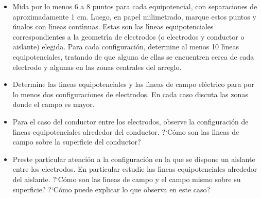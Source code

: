 \documentclass[laboratorio]{guia}
\begin{document}
\begin{itemize}
    \item Mida por lo menos 6 a 8 puntos para cada equipotencial, con
        separaciones de aproximadamente 1 cm. Luego, en papel milimetrado,
        marque estos puntos y \'unalos con l\'\i neas cont\'\i nuas. Estas son
        las l\'\i neas equipotenciales correspondientes a la geometr\'\i a de
        electrodos (o electrodos y conductor o aislante) elegida. Para cada
        configuraci\'on, determine al menos 10 l\'\i neas equipotenciales,
        tratando de que alguna de ellas se encuentren cerca de cada electrodo y
        algunas en las zonas centrales del arreglo.

    \item Determine las l\'\i neas equipotenciales y las l\'\i neas de campo
        el\'ectrico para por lo menos dos configuraciones de electrodos. En
        cada caso discuta las zonas donde el campo es mayor.

    \item Para el caso del conductor entre los electrodos, observe la
        configuraci\'on de l\'\i neas equipotenciales alrededor del conductor.
        ?`C\'omo son las l\'\i neas de campo sobre la superficie del conductor?

    \item Preste particular atenci\'on a la configuraci\'on en la que se
        dispone un aislante entre los electrodos. En particular estudie las
        l\'\i neas equipotenciales alrededor del aislante. ?`C\'omo son las
        l\'\i neas de campo y el campo mismo sobre su superficie? ?`C\'omo
        puede explicar lo que observa en este caso?
\end{itemize}


\nocite{Alonso1998,Purcell1988,Reitz1996,Trelles1984}
 

\end{document}

